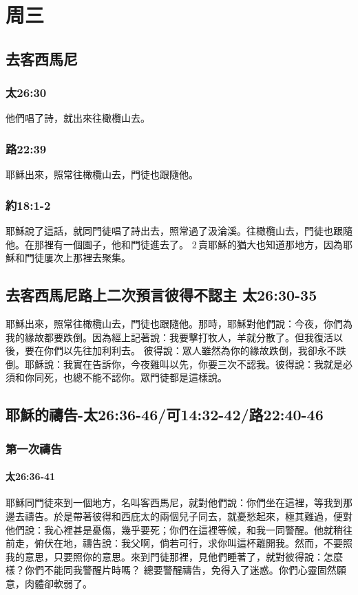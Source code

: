 \section{周三}
\subsection{去客西馬尼}
\subsubsection{太26:30}
他們唱了詩，就出來往橄欖山去。
\subsubsection{路22:39}
耶穌出來，照常往橄欖山去，門徒也跟隨他。
\subsubsection{約18:1-2}
耶穌說了這話，就同門徒唱了詩出去，照常過了汲淪溪。往橄欖山去，門徒也跟隨他。在那裡有一個園子，他和門徒進去了。 2 賣耶穌的猶大也知道那地方，因為耶穌和門徒屢次上那裡去聚集。

\subsection{去客西馬尼路上二次預言彼得不認主 太26:30-35}
耶穌出來，照常往橄欖山去，門徒也跟隨他。那時，耶穌對他們說：今夜，你們為我的緣故都要跌倒。因為經上記著說：我要擊打牧人，羊就分散了。但我復活以後，要在你們以先往加利利去。
彼得說：眾人雖然為你的緣故跌倒，我卻永不跌倒。耶穌說：我實在告訴你，今夜雞叫以先，你要三次不認我。彼得說：我就是必須和你同死，也總不能不認你。眾門徒都是這樣說。


\subsection{耶穌的禱告-太26:36-46/可14:32-42/路22:40-46}
\subsubsection{第一次禱告}
\paragraph{太26:36-41}
耶穌同門徒來到一個地方，名叫客西馬尼，就對他們說：你們坐在這裡，等我到那邊去禱告。於是帶著彼得和西庇太的兩個兒子同去，就憂愁起來，極其難過，便對他們說：我心裡甚是憂傷，幾乎要死；你們在這裡等候，和我一同警醒。他就稍往前走，俯伏在地，禱告說：我父啊，倘若可行，求你叫這杯離開我。然而，不要照我的意思，只要照你的意思。來到門徒那裡，見他們睡著了，就對彼得說：怎麼樣？你們不能同我警醒片時嗎？
總要警醒禱告，免得入了迷惑。你們心靈固然願意，肉體卻軟弱了。
